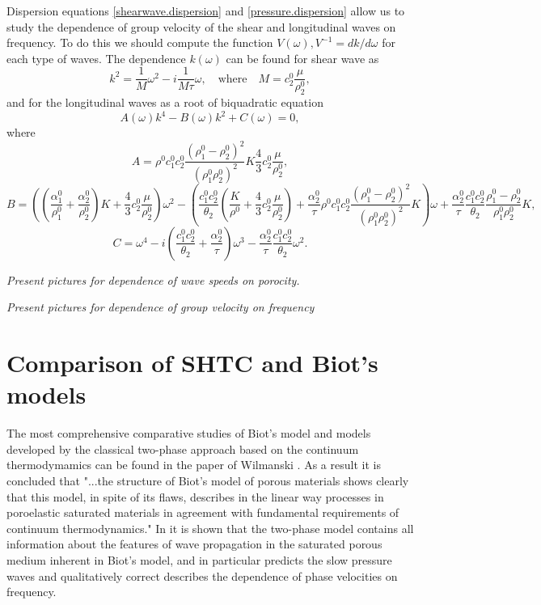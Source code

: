 \documentclass[3p,times]{elsarticle}
\begin{document}
Dispersion equations \eqref{shearwave.dispersion} and \eqref{pressure.dispersion} allow us to study the dependence of group velocity of the shear and longitudinal waves on frequency. To do this we should compute the function $V(\omega), V^{-1}=dk/d\omega$ for each type of waves.
The dependence $k(\omega)$ can be found for shear wave as 
$$
k^2=\frac{1}{M}\omega^2-i\frac{1}{M\tau}\omega, \quad \mathrm{where} \quad M=c_2^0\frac{\mu}{\rho_2^0},
$$
and for the longitudinal waves as a root of biquadratic equation
$$
A(\omega)k^4-B(\omega)k^2+C(\omega)=0,
$$
where 
$$
A=\rho^0c^0_1c^0_2\frac{\left(\rho^0_1-\rho^0_2\right)^2}{(\rho^0_1\rho^0_2)^2}K
\frac{4}{3}c^0_2\frac{\mu}{\rho^0_2},
$$
$$
B=\left(\left(\frac{\alpha_1^0}{\rho_1^0}+\frac{\alpha_2^0}{\rho_2^0}\right)K+
\frac{4}{3}c^0_2\frac{\mu}{\rho_2^0} \right)\omega^2 -
\left(\frac{c^0_1c^0_2}{\theta_2}\left(\frac{K}{\rho^0}+\frac{4}{3}c^0_2\frac{\mu}{\rho^0_2}
\right) 
+\frac{\alpha^0_2}{\tau}\rho^0c^0_1c^0_2\frac{\left(\rho^0_1-\rho^0_2\right)^2}{(\rho^0_1\rho^0_2)^2}K\right) \omega+
\frac{\alpha^0_2}{\tau}\frac{c^0_1c^0_2}{\theta_2}\frac{\rho_1^0-\rho_2^0}{\rho_1^0\rho_2^0}K,
$$
$$
C=\omega^4-i\left(\frac{c^0_1c^0_2}{\theta_2}+\frac{\alpha^0_2}{\tau} \right) \omega^3
-\frac{\alpha^0_2}{\tau}\frac{c^0_1c^0_2}{\theta_2} \omega^2.
$$

{\it Present pictures for dependence of wave speeds on porocity.}

{\it Present pictures for dependence of group velocity on frequency}


\section{Comparison of SHTC and Biot's models}

The most comprehensive comparative studies of Biot's model and models developed by the classical two-phase approach based on the continuum thermodymamics can be found in the paper of Wilmanski \cite{Wilmanski2006}. As a result it is concluded that "...the
structure of Biot’s model of porous materials shows clearly
that this model, in spite of its flaws, describes in the linear
way processes in poroelastic saturated materials in agreement
with fundamental requirements of continuum thermodynamics."
In \cite{Wilmanski2006} it is shown that the two-phase model contains all information about the features of wave propagation in the saturated porous medium inherent in Biot's model, and in particular predicts the slow pressure waves and qualitatively correct describes the dependence of phase velocities on frequency. 
\end{document}
